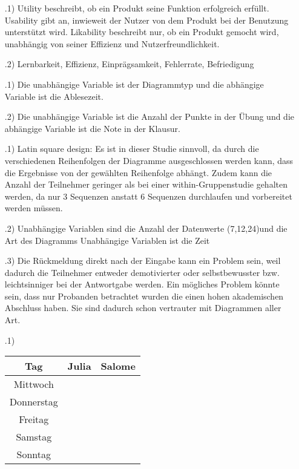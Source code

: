 \documentclass[12pt]{scrartcl}
\begin{document}
\exercise{}
    \begin{itemize}
        \item[\theenumi.1)]
            Utility beschreibt, ob ein Produkt seine Funktion erfolgreich erfüllt.
            Usability gibt an, inwieweit der Nutzer von dem Produkt bei der Benutzung unterstützt wird.
            Likability beschreibt nur, ob ein Produkt gemocht wird, unabhängig von seiner Effizienz und Nutzerfreundlichkeit.
        \item[\theenumi.2)]Lernbarkeit, Effizienz, Einprägsamkeit, Fehlerrate, Befriedigung 
    \end{itemize}

\setcounter{enumi}{4}
\exercise{}
\begin{itemize}
    \item[\theenumi.1)] Die unabhängige Variable ist der Diagrammtyp und die abhängige Variable ist die Ablesezeit.
    \item[\theenumi.2)] Die unabhängige Variable ist die Anzahl der Punkte in der Übung und die abhängige Variable ist die Note in der Klausur.
\end{itemize}

\exercise{}

\begin{itemize}
    \item[\theenumi.1)] Latin square design: Es ist in dieser Studie sinnvoll, da durch die verschiedenen Reihenfolgen der Diagramme ausgeschlossen werden kann, dass die Ergebnisse von der gewählten Reihenfolge abhängt. Zudem kann die Anzahl der Teilnehmer geringer als bei einer within-Gruppenstudie gehalten werden, da nur 3 Sequenzen anstatt 6 Sequenzen durchlaufen und vorbereitet werden müssen.
	\item[\theenumi.2)] Unabhängige Variablen sind die Anzahl der Datenwerte (7,12,24)und die Art des Diagramms
	Unabhängige Variablen ist die Zeit
	\item[\theenumi.3)] Die Rückmeldung direkt nach der Eingabe kann ein Problem sein, weil dadurch die Teilnehmer entweder demotivierter oder selbstbewusster bzw. leichtsinniger bei der Antwortgabe werden.
	Ein mögliches Problem könnte sein, dass nur Probanden betrachtet wurden die einen hohen akademischen Abschluss haben. Sie sind dadurch schon vertrauter mit Diagrammen aller Art.
\end{itemize}


\exercise{}
\begin{itemize}
    \item[\theenumi.1)] \, \\
        \begin{tabular}{c c c}
            Tag & Julia & Salome\\ \hline
            Mittwoch & & \\ \hline
            Donnerstag & & \\ \hline
            Freitag & & \\ \hline
            Samstag & & \\ \hline
            Sonntag & & \\ \hline
        \end{tabular}
\end{itemize}
        
\end{document}
